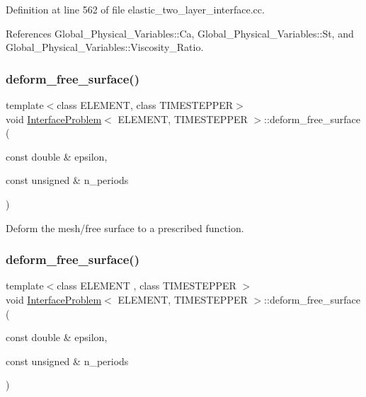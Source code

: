 Definition at line 562 of file elastic\+\_\+two\+\_\+layer\+\_\+interface.\+cc.



References Global\+\_\+\+Physical\+\_\+\+Variables\+::\+Ca, Global\+\_\+\+Physical\+\_\+\+Variables\+::\+St, and Global\+\_\+\+Physical\+\_\+\+Variables\+::\+Viscosity\+\_\+\+Ratio.

\mbox{\label{classInterfaceProblem_a2319232b08d9df1ab473f6cbd40939d5}} 
\subsubsection{\texorpdfstring{deform\+\_\+free\+\_\+surface()}{deform\_free\_surface()}\hspace{0.1cm}{\footnotesize\ttfamily [1/2]}}
{\footnotesize\ttfamily template$<$class E\+L\+E\+M\+E\+NT, class T\+I\+M\+E\+S\+T\+E\+P\+P\+ER$>$ \\
void \hyperlink{classInterfaceProblem}{Interface\+Problem}$<$ E\+L\+E\+M\+E\+NT, T\+I\+M\+E\+S\+T\+E\+P\+P\+ER $>$\+::deform\+\_\+free\+\_\+surface (\begin{DoxyParamCaption}\item[{const double \&}]{epsilon,  }\item[{const unsigned \&}]{n\+\_\+periods }\end{DoxyParamCaption})\hspace{0.3cm}{\ttfamily [private]}}



Deform the mesh/free surface to a prescribed function. 

\mbox{\label{classInterfaceProblem_a2319232b08d9df1ab473f6cbd40939d5}} 
\subsubsection{\texorpdfstring{deform\+\_\+free\+\_\+surface()}{deform\_free\_surface()}\hspace{0.1cm}{\footnotesize\ttfamily [2/2]}}
{\footnotesize\ttfamily template$<$class E\+L\+E\+M\+E\+NT , class T\+I\+M\+E\+S\+T\+E\+P\+P\+ER $>$ \\
void \hyperlink{classInterfaceProblem}{Interface\+Problem}$<$ E\+L\+E\+M\+E\+NT, T\+I\+M\+E\+S\+T\+E\+P\+P\+ER $>$\+::deform\+\_\+free\+\_\+surface (\begin{DoxyParamCaption}\item[{const double \&}]{epsilon,  }\item[{const unsigned \&}]{n\+\_\+periods }\end{DoxyParamCaption})\hspace{0.3cm}{\ttfamily [private]}}




